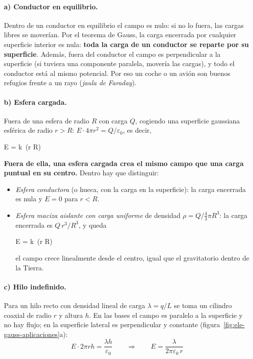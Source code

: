 \paragraph{a) Conductor en equilibrio.} Dentro de un conductor en equilibrio el campo es nulo: si no lo fuera, las cargas
libres se moverían. Por el teorema de Gauss, la carga encerrada por cualquier superficie interior es nula: \textbf{toda la carga
de un conductor se reparte por su superficie}. Además, fuera del conductor el campo es perpendicular a la superficie (si
tuviera una componente paralela, movería las cargas), y todo el conductor está al mismo potencial. Por eso un coche o un
avión son buenos refugios frente a un rayo (\emph{jaula de Faraday}).

\paragraph{b) Esfera cargada.} Fuera de una esfera de radio \(R\) con carga \(Q\), cogiendo una superficie gaussiana esférica
de radio \(r > R\): \(E\cdot 4\pi r^2 = Q/\varepsilon_0\), es decir,
\begin{centeredequation}
    E = k\, \qquad (r \geq R) \label{eq:ele-esfera-fuera}
\end{centeredequation}
\textbf{Fuera de ella, una esfera cargada crea el mismo campo que una carga puntual en su centro.} Dentro hay que distinguir:
\begin{itemize}
    \item \emph{Esfera conductora} (o hueca, con la carga en la superficie): la carga encerrada es nula y \(E = 0\) para \(r < R\).
    \item \emph{Esfera maciza aislante con carga uniforme} de densidad \(\rho = Q/\tfrac{4}{3}\pi R^3\): la carga encerrada es
    \(Q\,r^3/R^3\), y queda
    \begin{centeredequation}
        E = k\, \qquad (r \leq R) \label{eq:ele-esfera-dentro}
    \end{centeredequation}
    el campo crece linealmente desde el centro, igual que el gravitatorio dentro de la Tierra.
\end{itemize}

\paragraph{c) Hilo indefinido.} Para un hilo recto con densidad lineal de carga \(\lambda = q/L\) se toma un cilindro coaxial
de radio \(r\) y altura \(h\). En las bases el campo es paralelo a la superficie y no hay flujo; en la superficie lateral es
perpendicular y constante (figura~\ref{fig:ele-gauss-aplicaciones}a):
\begin{equation*}
    E\cdot 2\pi r h = \dfrac{\lambda h}{\varepsilon_0} \qquad\Rightarrow\qquad \boxed{E = \dfrac{\lambda}{2\pi\varepsilon_0\,r}}
\end{equation*}

